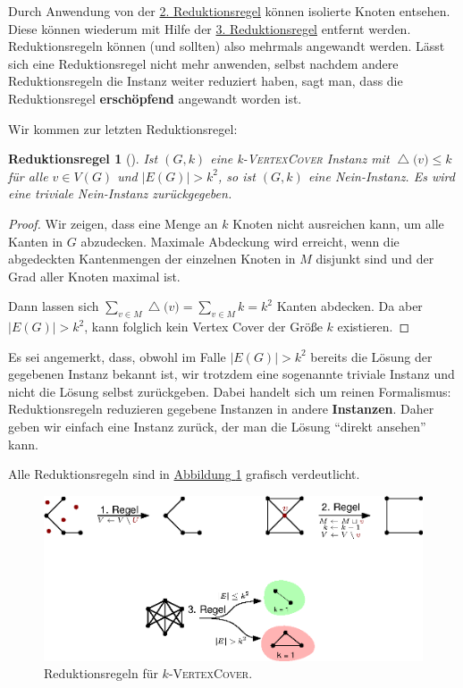 \documentclass[a4paper,ngerman]{atseminar}
\renewcommand{\deg}[1]{\ensuremath{\operatorname{\triangle}\bigl(#1\bigr)}\xspace}
\newcounter{reductionruleCounter}
\newtheorem{reductionrule}[reductionruleCounter]{\textbf{Reduktionsregel}}
\begin{document}
\begin{example}
    \noindent
    Durch Anwendung von der \hyperref[OE:reduction:2]{2. Reduktionsregel} können isolierte Knoten entsehen. Diese können wiederum mit Hilfe der \hyperref[OE:reduction:3]{3. Reduktionsregel} entfernt
    werden.
    Reduktionsregeln können (und sollten) also mehrmals angewandt werden. Lässt sich eine Reduktionsregel nicht mehr anwenden, selbst nachdem andere Reduktionsregeln
    die Instanz weiter reduziert haben, sagt man, dass die Reduktionsregel \textbf{erschöpfend} angewandt worden ist.

    \noindent
    Wir kommen zur letzten Reduktionsregel:

    \begin{reductionrule}[\cite{Beyond}]
      \label{OE:reduction:3}
      Ist $(G, k)$ eine k-\textsc{VertexCover} Instanz mit $\deg{v} \leq k$ für alle $ v \in V(G)$ und $|E(G)| > k^2$, so ist $(G, k)$
      eine Nein-Instanz. Es wird eine triviale Nein-Instanz zurückgegeben. 
    \end{reductionrule}
    \begin{proof}
      Wir zeigen, dass eine Menge an $k$ Knoten nicht ausreichen kann, um alle Kanten in $G$ abzudecken.
      \noindent
      Maximale Abdeckung wird erreicht, wenn die abgedeckten Kantenmengen der einzelnen Knoten in $M$ disjunkt sind und der Grad aller Knoten maximal ist.
      
      \noindent
      Dann lassen sich $\sum_{v \in M}{\deg{v}} = \sum_{v \in M}{k} = k^2$ Kanten abdecken.
      \noindent
      Da aber $|E(G)| > k^2$, kann folglich kein Vertex Cover der Größe $k$ existieren.
    \end{proof}
    Es sei angemerkt, dass, obwohl im Falle $|E(G)| > k^2$ bereits die Lösung der gegebenen Instanz bekannt ist, wir trotzdem eine sogenannte triviale Instanz
    und nicht die Lösung selbst zurückgeben. Dabei handelt sich um reinen Formalismus: Reduktionsregeln reduzieren gegebene Instanzen in
    andere \textbf{Instanzen}. Daher geben wir einfach eine Instanz zurück, der man die Lösung \enquote{direkt ansehen} kann.

    \noindent
    Alle Reduktionsregeln sind in \hyperref[OE:fig:reductionRules]{Abbildung }\ref{OE:fig:reductionRules} grafisch verdeutlicht.

    \begin{figure}[h]
      \centering
      \includegraphics[scale = 1.0]{./images/reduction-rules.eps}
      \caption{Reduktionsregeln für $k$-\textsc{VertexCover}.}
      \label{OE:fig:reductionRules}
     \end{figure}
    

\end{example}
\end{document}
